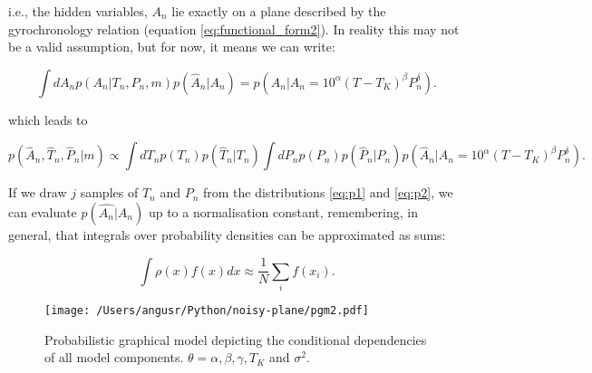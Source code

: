 \documentclass[12pt,preprint]{aastex}
\begin{document}
i.e., the hidden variables, $A_n$ lie exactly on a plane described by the gyrochronology relation (equation \ref{eq:functional_form2}).
In reality this may not be a valid assumption, but for now, it means we can write:

\begin{equation}
  \int{dA_n p(A_n | T_n, P_n, m) p(\hat{A}_n | A_n)}
  = p(\hat{A}_n | A_n = 10^\alpha (T-T_K)^\beta P_n^\delta) .
\end{equation}

which leads to

\begin{equation}
  p(\hat{A}_n, \hat{T}_n, \hat{P}_n | m) \propto
    \int dT_n p(T_n) p(\hat{T}_n | T_n) \int dP_n p(P_n) p(\hat{P}_n | P_n)
    p(\hat{A}_n | A_n = 10^\alpha (T-T_K)^\beta P_n^\delta) .
\end{equation}

If we draw $j$ samples of $T_n$ and $P_n$ from the distributions \ref{eq:p1} and \ref{eq:p2}, we can evaluate $p(\hat{A_n}|A_n)$ up to a normalisation constant, remembering, in general, that integrals over probability densities can be approximated as sums:

\begin{equation}
  \int{\rho(x) f(x) dx \approx \frac{1}{N} \sum_i f(x_i)} .
  \label{eq:example}
\end{equation}

\begin{figure}[ht]
\begin{center}
\texttt{[image: /Users/angusr/Python/noisy-plane/pgm2.pdf]}
\caption{Probabilistic graphical model depicting the conditional dependencies of all model components. $\theta = \alpha, \beta, \gamma, T_K$ and $\sigma^2$.}
\label{fig:results}
\end{center}
\end{figure}
\end{document}
